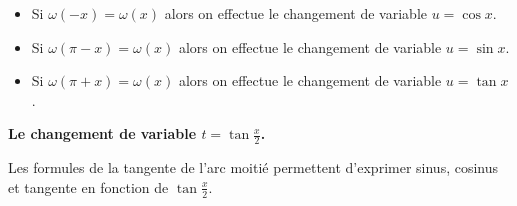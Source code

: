 \documentclass[10pt,class=article,crop=false]{standalone}
\begin{document}
\begin{multicols}{2}
\begin{itemize}
	\item Si $\omega(-x)=\omega(x)$ alors on effectue le changement de variable $u=\cos x$.
	
	\item Si $\omega(\pi-x)=\omega(x)$ alors on effectue le changement de variable $u=\sin x$.
	
	\item Si $\omega(\pi + x)=\omega(x)$ alors on effectue le changement de variable $u=\tan x$.
\end{itemize}



\textbf{Le changement de variable $t=\tan \frac x2$.}

Les formules de la \og tangente de l'arc moitié \fg{} permettent d'exprimer sinus, cosinus et tangente
en fonction de $\tan \frac x2$.



\end{multicols}
\end{document}

